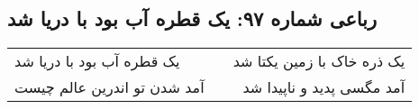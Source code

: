 \begin{center}
\section*{رباعی شماره ۹۷: یک قطره آب بود با دریا شد}
\label{sec:sh097}
\begin{longtable}{l p{0.5cm} r}
یک قطره آب بود با دریا شد
&&
یک ذره خاک با زمین یکتا شد
\\
آمد شدن تو اندرین عالم چیست
&&
آمد مگسی پدید و ناپیدا شد
\\
\end{longtable}
\end{center}
